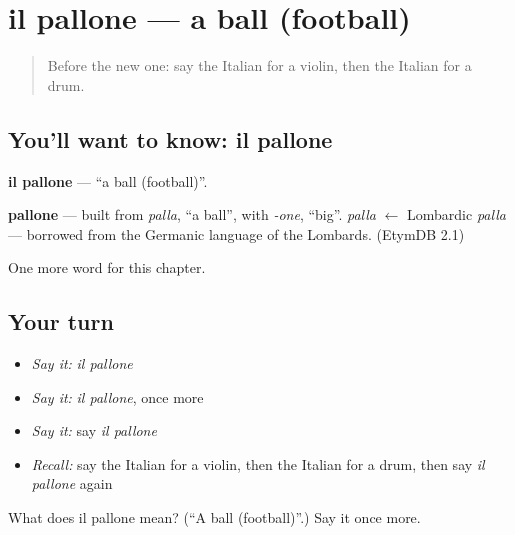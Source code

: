 \section[il pallone]{il pallone — a ball (football)}

\label{lesson:IT-C170-pallone}



\begin{quote}
Before the new one: say the Italian for a violin, then the Italian for a drum.
\end{quote}

\subsection*{You'll want to know: il pallone}
\textbf{il pallone} — \textquotedblleft{}a ball (football)\textquotedblright{}.

\begin{cousinweb}
\textbf{pallone} — built from \emph{palla}, \textquotedblleft{}a ball\textquotedblright{}, with \emph{-one}, \textquotedblleft{}big\textquotedblright{}. \emph{palla} $\leftarrow$ Lombardic \emph{palla} — borrowed from the Germanic language of the Lombards. (EtymDB 2.1)
\end{cousinweb}

\begin{grammarlens}[title={What you've built}]
One more word for this chapter.
\end{grammarlens}

\subsection*{Your turn}
\begin{itemize}
\raggedright
  \item \emph{Say it:} \emph{il pallone}
  \item \emph{Say it:} \emph{il pallone}, once more
  \item \emph{Say it:} say \emph{il pallone}
  \item \emph{Recall:} say the Italian for a violin, then the Italian for a drum, then say \emph{il pallone} again
\end{itemize}

\begin{tcolorbox}[breakable,colback=teal!4,colframe=teal!35!black,title={Before you move on}]
What does il pallone mean? (\textquotedblleft{}A ball (football)\textquotedblright{}.) Say it once more.
\end{tcolorbox}
